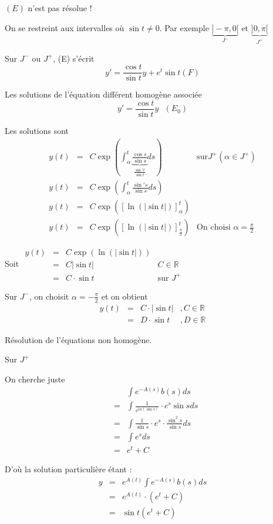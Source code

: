 $(E)$ n'est pas résolue !

On se restreint aux intervalles où $\sin t \neq 0$. Par exemple $\underbrace{]-\pi, 0[}_{J^-}$ et $\underbrace{]0, \pi[}_{J^+}$

Sur $J^-$ ou $J^+$, (E) s'écrit \[y' = \frac{\cos t}{\sin t}y + e^t \sin t (F)\]

Les solutions de l'équation différent homogène associée \[y' = \frac{\cos t}{\sin t} y \text{ } (E_0)\]

Les solutions sont \[\begin{array}{rclr}
y(t) &=& C \exp(\int^t_\alpha \underbrace{\frac{\cos s}{\sin s}}_{\frac{\sin't}{\sin t}}ds) &\text{sur} J^+ (\alpha \in J^+) \\
y(t) &=& C \exp(\int^t_\alpha \frac{\sin's}{\sin s}ds) \\ 
y(t) &=& C \exp([\ln(|\sin t|)]^t_\alpha) \\ 
y(t) &=& C \exp([\ln(|\sin t|)]^t_{\frac{\pi}{2}}) & \text{On choisi } \alpha = \frac{\pi}{2}
\end{array}\]

Soit $\begin{array}{rclr}y(t) &=& C\exp(\ln(|\sin t|)) \\
&=& C|\sin t| & C \in \mathbb{R}\\
&=& C\cdot \sin t & \text{sur } J^+\end{array}$

Sur $J^-$, on choisit $\alpha = -\frac{\pi}{2}$ et on obtient \[\begin{array}{rclr}
y(t) &=& C\cdot |\sin t|&, C \in \mathbb{R} \\
&=& D \cdot \sin t&, D \in \mathbb{R}\end{array}\]

Résolution de l'équations non homogène.

Sur $J^+$

On cherche juste \[\begin{array}{rcl}
&&\int e^{-A(s)}b(s)ds \\
&=& \int \frac{1}{e^{ln({\sin s})}} \cdot e^s \sin s ds \\
&=& \int \frac{1}{\sin s} \cdot e^s \cdot \frac{\sin^2 s}{\sin s} ds \\
&=& \int e^s ds \\
&=& e^t + C\end{array}\]

D'où la solution particulière étant :
\[\begin{array}{rcl}
y &=& e^{A(t)}\int e^{-A(s)}b(s) ds \\
&=& e^{A(t)}\cdot(e^t + C) \\
&=& \sin t (e^t + C)\end{array}\]

